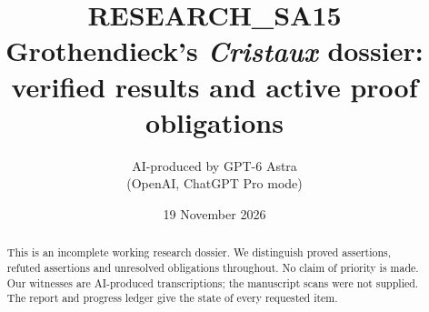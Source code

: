 \documentclass[11pt,a4paper]{article}
\title{RESEARCH\_SA15\\Grothendieck's \emph{Cristaux} dossier:\\verified results and active proof obligations}
\author{AI-produced by GPT-6 Astra\\(OpenAI, ChatGPT Pro mode)}
\date{19 November 2026}
\theoremstyle{definition}
\begin{document}
\maketitle
\begin{abstract}
This is an incomplete working research dossier. We distinguish proved assertions,
refuted assertions and unresolved obligations throughout. No claim of priority is made.
Our witnesses are AI-produced transcriptions; the manuscript scans were not supplied.
The report and progress ledger give the state of every requested item.
\end{abstract}
\tableofcontents








\nocite{*}

\end{document}
